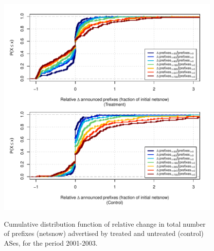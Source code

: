 \clearpage
\vspace*{1.25em}
\begin{figure}[H]
\begin{centering}
\begin{singlespace}
\captionsetup{list=no}
    \includegraphics[width=6in]{figures/behavior-rel_netsnow-2001_2003-corr.pdf}
    \vspace{-2em}\\
    \caption{Cumulative distribution function of relative change in total
    number of prefixes (netsnow) advertised by treated and untreated (control)
    ASes, for the period 2001-2003.}
\end{singlespace}
\end{centering}
\end{figure}

